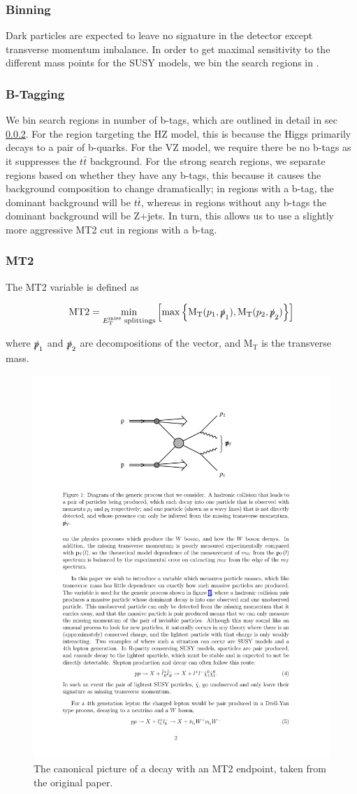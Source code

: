     \subsubsection{\MET Binning}

      Dark particles are expected to leave no signature in the detector except transverse momentum imbalance. In order to get maximal sensitivity to the different mass points for the SUSY models, we bin the search regions in \MET.

    \subsubsection{B-Tagging} \label{sec:b-tagging}
      We bin search regions in number of b-tags, which are outlined in detail in sec \ref{sec:b-tagging}. For the region targeting the HZ model, this is because the Higgs primarily decays to a pair of b-quarks. For the VZ model, we require there be no b-tags as it suppresses the $t\bar{t}$ background. For the strong search regions, we separate regions based on whether they have any b-tags, this because it causes the background composition to change dramatically; in regions with a b-tag, the dominant background will be $t\bar{t}$, whereas in regions without any b-tags the dominant background will be Z+jets. In turn, this allows us to use a slightly more aggressive MT2 cut in regions with a b-tag.

    \subsubsection{MT2} \label{sec:MT2}
      The MT2 variable is defined as

      \[
      \text{MT2} = \min \limits_{\text{\MET splittings}} \left[ \max \left\{ \MT(p_1, \slashed{p}_1), \MT(p_2, \slashed{p}_2) \right\} \right]
      \]

      where $\slashed{p}_1$ and $\slashed{p}_2$ are decompositions of the \MET vector, and M$_{\text{T}}$ is the transverse mass. 

      \begin{figure}[h!]
        \centering
        \includegraphics[width=.5\textwidth]{figures/mt2_diagram.pdf}
        \caption{The canonical picture of a decay with an MT2 endpoint, taken from the original paper\cite{mt2_paper}. }
        \label{fig:MT2_feynman_diagram}
      \end{figure}

